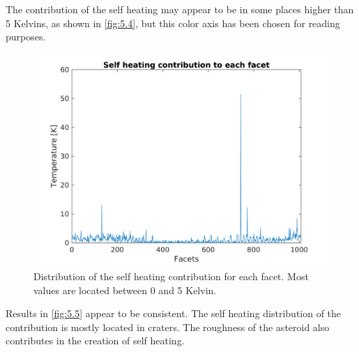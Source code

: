 The contribution of the self heating may appear to be in some places higher than 5 Kelvins, as shown in \autoref{fig:5.4}, but this color axis has been chosen for reading purposes.
\begin{figure}
    \centering
    \includegraphics[width=\linewidth]{rsc/self_contribution.png}
    \caption{Distribution of the self heating contribution for each facet. Most values are located between 0 and 5 Kelvin.}
    \label{fig:5.4}
\end{figure}

Results in \autoref{fig:5.5} appear to be consistent. The self heating distribution of the contribution is mostly located in craters. The roughness of the asteroid also contributes in the creation of self heating.
